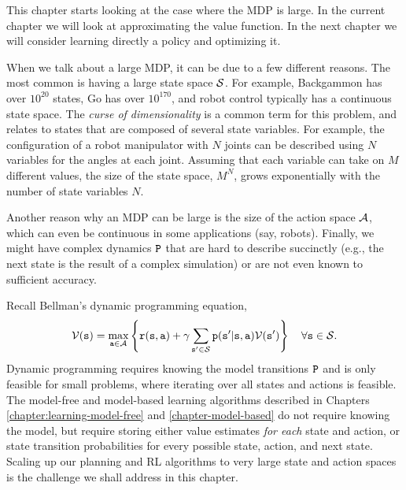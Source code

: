 \usetikzlibrary{calc}
\usetikzlibrary{shapes,arrows}
%
%
%

\newcommand{\ftrs}{\phi}
\newcommand{\FtrMtx}{\Phi}

This chapter starts looking at the case where the MDP is
large. In the current chapter we will look at approximating the
value function. In the next chapter we will consider learning
directly a policy and optimizing it.

When we talk about a large MDP, it can be due to a few different
reasons. The most common is having a large state space $\mathcal{S}$. For example,
Backgammon has over $10^{20}$ states, Go has over $10^{170}$, and robot control typically 
has a continuous state space. The \textit{curse of dimensionality} is a common term for this problem, and relates to states that are composed of several state variables. For example, the configuration of a robot manipulator with $N$ joints can be described using $N$ variables for the angles at each joint. Assuming that each variable can take on $M$ different values, the size of the state space, $M^N$, grows exponentially with the number of state variables $N$.

Another reason why an MDP can be large is the size of the action space $\mathcal{A}$,
which can even be continuous in some applications (say, robots).
Finally, we might have complex dynamics ${\tt P}$ that are hard to describe
succinctly (e.g., the next state is the result of a complex simulation) or are not even known to sufficient accuracy. 

Recall Bellman's dynamic programming equation,
$$\mathcal{V}({\tt s}) = \max_{{\tt a} \in \mathcal{A}} \left\{{\tt r}({\tt s},{\tt a}) + \gamma \sum_{{\tt s}' \in \mathcal{S}} {\tt p}({\tt s}'|{\tt s},{\tt a})\mathcal{V}({\tt s}')\right\}\quad \forall {\tt s} \in \mathcal{S}.$$
Dynamic programming requires knowing the model transitions ${\tt P}$ and is only feasible for small problems, where iterating over all states and actions is feasible. The model-free and model-based learning algorithms described in Chapters \ref{chapter:learning-model-free} and \ref{chapter-model-based} do not require knowing the model, but require storing either value estimates \textit{for each} state and action, or state transition probabilities for every possible state, action, and next state. Scaling up our planning and RL algorithms to very large state and action spaces is the challenge we shall address in this chapter.


